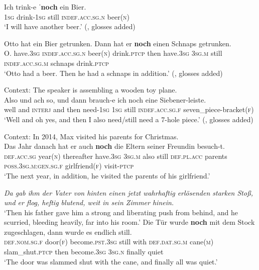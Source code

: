 \begin{exe}
	\ex\label{exAppendixGermanAdditive1}
	\gll Ich trink-e \textbf{\textup{ˈ}noch} ein Bier.\\
	1\textsc{sg} drink-1\textsc{sg} still \textsc{indef}.\textsc{acc}.\textsc{sg}.\textsc{n} beer(\textsc{n})\\
	\glt \lq I will have another beer.' (\cite[143]{Koenig1991}, glosses added)

	\ex\label{exAppendixGermanAdditive2}
	\gll Otto hat ein Bier getrunken. Dann hat er \textbf{noch} einen Schnaps getrunken.\\
	O. have.3\textsc{sg} \textsc{indef}.\textsc{acc}.\textsc{sg}.\textsc{n} beer(\textsc{n}) drink.\textsc{ptcp} then have.3\textsc{sg} 3\textsc{sg}.\textsc{m} still \textsc{indef}.\textsc{acc}.\textsc{sg}.\textsc{m} schnaps drink.\textsc{ptcp}\\
	\glt \lq Otto had a beer. Then he had a schnaps in addition.\rq{ }(\cite[1850]{Umbach2012}, glosses added)
	\ex\label{exAppendixGermanAdditive4}

	Context: The speaker is assembling a wooden toy plane.\\
	\gll Also und {ach so}, und dann brauch-e ich noch eine Siebener-leiste.\\
	well and \textsc{interj} and then need-1\textsc{sg} 1\textsc{sg} still \textsc{indef}.\textsc{acc}.\textsc{sg}.\textsc{f} seven\_piece-bracket(\textsc{f})\\
	\glt \lq Well and oh yes, and then I also need/still need a 7-hole piece.\rq{ }(\cite[104]{Nederstigt2003}, glosses added)

	\ex\label{exAppendixGermanAdditive5}
	Context: In 2014, Max visited his parents for Christmas.\\
	\gll Das Jahr danach hat er auch \textbf{noch} die Eltern seiner Freundin besuch-t.\\
	\textsc{def}.\textsc{acc}.\textsc{sg} year(\textsc{n}) thereafter have.3\textsc{sg} 3\textsc{sg}.\textsc{m} also still \textsc{def}.\textsc{pl}.\textsc{acc} parents \textsc{poss}.3\textsc{sg}.\textsc{m}:\textsc{gen}.\textsc{sg}.\textsc{f} girlfriend(\textsc{f}) visit-\textsc{ptcp}\\
	\glt \lq The next year, in addition, he visited the parents of his girlfriend.\rq{ }\parencite[528]{Grubic2018}
	
		\ex\label{exAppendixGermanFurtherTo6}
	\textit{Da gab ihm der Vater von hinten einen jetzt wahrhaftig erlösenden starken Stoß, und er flog, heftig blutend, weit in sein Zimmer hinein.}\\
	\lq Then his father gave him a strong and liberating push from behind, and he scurried, bleeding heavily, far into his room.'
	\exi{}\gll Die Tür wurde \textbf{noch} mit dem Stock zugeschlagen, dann wurde es endlich still.\\
	\textsc{def}.\textsc{nom}.\textsc{sg}.\textsc{f} door(\textsc{f}) become.\textsc{pst}.3\textsc{sg} still with \textsc{def}.\textsc{dat}.\textsc{sg}.\textsc{m} cane(\textsc{m}) slam\_shut.\textsc{ptcp} then become.3\textsc{sg} 3\textsc{sg}.\textsc{n} finally quiet\\
	\glt \lq{}The door was slammed shut with the cane, and finally all was quiet.'
	

\end{exe}
